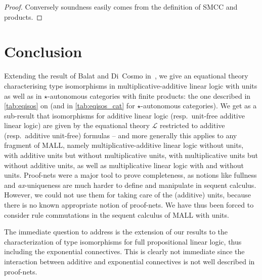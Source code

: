 \documentclass{lmcs}
\newcommand*{\resp}{resp.}
\newcommand*{\Eu}{\mathcal{L}} %
\newcommand*{\unique}{\textit{ax}-unique}
\begin{document}
\begin{proof}
Conversely soundness easily comes from the definition of SMCC and products.
\end{proof}


\section{Conclusion}
\label{sec:conclu}

Extending the result of Balat and Di~Cosmo in~\cite{mllisos}, we give an equational theory characterising type isomorphisms in multiplicative-additive linear logic with units as well as in $\star$-autonomous categories with finite products: the one described in \autoref{tab:eqisos} on  (and in \autoref{tab:eqisos_cat} for $\star$-autonomous categories).
We get as a sub-result that isomorphisms for additive linear logic (\resp\ unit-free additive linear logic) are given by the equational theory $\Eu$ restricted to additive (\resp\ additive unit-free) formulas -- and more generally this applies to any fragment of MALL, namely multiplicative-additive linear logic without units, with additive units but without multiplicative units, with multiplicative units but without additive units, as well as multiplicative linear logic with and without units.
Proof-nets were a major tool to prove completeness, as notions like fullness and \unique ness are much harder to define and manipulate in sequent calculus.
However, we could not use them for taking care of the (additive) units, because there is no known appropriate notion of proof-nets.
We have thus been forced to consider rule commutations in the sequent calculus of MALL with units.

The immediate question to address is the extension of our results to the characterization of type isomorphisms for full propositional linear logic, thus including the exponential connectives.
This is clearly not immediate since the interaction between additive and exponential connectives is not well described in proof-nets.
\end{document}
